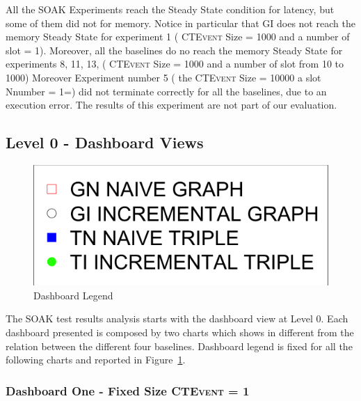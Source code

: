 


All the SOAK Experiments reach the Steady State condition for latency, but some of them did not for memory. Notice in particular that GI does not reach the memory Steady State for experiment 1 (  \textsc{CTEvent}  Size = 1000 and a number of slot = 1). Moreover, all the baselines do no reach the memory  Steady State for experiments 8, 11, 13, ( \textsc{CTEvent}  Size = 1000 and a number of slot from 10 to 1000)  Moreover Experiment number 5 ( the \textsc{CTEvent} Size = 10000 a slot Nnumber = 1=) did not terminate correctly for all the baselines, due to an execution error. The results of this experiment are not part of our evaluation.

\subsection{Level 0 - Dashboard Views}\label{sec:eval-level0}

\begin{figure}[htb]
	\centering
	\includegraphics[width=0.25\linewidth]{images/dashboard-legend}	
	\caption{Dashboard Legend} 
	\label{fig:dashboard-legend}
\end{figure}

The SOAK test results analysis starts with the dashboard view at Level 0. Each dashboard presented is composed by two charts which shows in different from the relation between the different four baselines. Dashboard legend is fixed for all the following charts and reported in Figure~\ref{fig:dashboard-legend}.

\subsubsection{Dashboard One - Fixed Size \textsc{CTEvent} = 1} 

